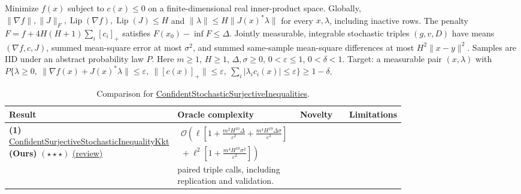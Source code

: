 \begin{table}[tp]
\centering
\caption{Comparison for \href{https://github.com/k3nfalt/longtails/blob/main/LongTails/Setups/ConfidentStochasticSurjectiveInequalities.lean}{ConfidentStochasticSurjectiveInequalities}.}\label{tab:ConfidentStochasticSurjectiveInequalities}
\parbox{\linewidth}{\footnotesize Minimize $f(x)$ subject to $c(x)\le0$ on a finite-dimensional real inner-product space. Globally, $\|\nabla f\|,\|J\|_F,\operatorname{Lip}(\nabla f),\operatorname{Lip}(J)\le H$ and $\|\lambda\|\le H\|J(x)^*\lambda\|$ for every $x,\lambda$, including inactive rows. The penalty $F=f+4H(H+1)\sum_i[c_i]_+$ satisfies $F(x_0)-\inf F\le\Delta$. Jointly measurable, integrable stochastic triples $(g,v,D)$ have means $(\nabla f,c,J)$, summed mean-square error at most $\sigma^2$, and summed same-sample mean-square differences at most $H^2\|x-y\|^2$. Samples are IID under an abstract probability law $P$. Here $m\ge1$, $H\ge1$, $\Delta,\sigma\ge0$, $0<\varepsilon\le1$, $0<\delta<1$. Target: a measurable pair $(x,\lambda)$ with $P\{\lambda\ge0,\ \|\nabla f(x)+J(x)^*\lambda\|\le\varepsilon,\ \|[c(x)]_+\|\le\varepsilon,\ \sum_i|\lambda_i c_i(x)|\le\varepsilon\}\ge1-\delta$.}\par\smallskip
\begin{threeparttable}
\footnotesize
\setlength{\tabcolsep}{4pt}\renewcommand{\arraystretch}{1.25}
\begin{tabularx}{\linewidth}{@{}>{\raggedright\arraybackslash}p{0.20\linewidth}>{\raggedright\arraybackslash}p{0.32\linewidth}>{\raggedright\arraybackslash}p{0.25\linewidth}>{\raggedright\arraybackslash}X@{}}
\toprule
\textbf{Result} & \textbf{Oracle complexity} & \textbf{Novelty} & \textbf{Limitations} \\
\midrule
\textbf{(1)} \href{https://github.com/k3nfalt/longtails/blob/main/LongTails/Theorems/ConfidentSurjectiveStochasticInequalityKkt.lean}{Confident\allowbreak Surjective\allowbreak Stochastic\allowbreak Inequality\allowbreak Kkt} \textbf{(Ours)} $(\star\star\star)$ \href{https://github.com/k3nfalt/longtails/blob/main/scripts/reviews/ConfidentSurjectiveStochasticInequalityKkt.md}{(review)} &
$\begin{gathered}\mathcal{O}\!\left(\ell\left[1+\frac{m^2H^{10}\Delta}{\varepsilon^2}+\frac{m^4H^{19}\Delta\sigma}{\varepsilon^3}\right]\right.\\\left.{}+\ell^2\left[1+\frac{m^4H^{18}\sigma^2}{\varepsilon^2}\right]\right)\end{gathered}$ paired triple calls, including replication and validation. & & \\

\end{tabularx}
\end{threeparttable}
\end{table}
